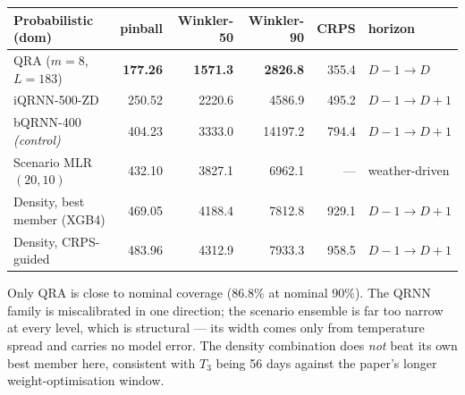 \documentclass[11pt]{article}
\begin{document}
\begin{center}\small
\begin{tabular}{@{}lrrrrl@{}}
\toprule
Probabilistic (dom) & pinball & Winkler-50 & Winkler-90 & CRPS & horizon \\
\midrule
QRA ($m{=}8$, $L{=}183$)        & \textbf{177.26} & \textbf{1571.3} & \textbf{2826.8} & 355.4 & $D{-}1 \to D$ \\
iQRNN-500-ZD                    & 250.52 & 2220.6 & 4586.9 & 495.2 & $D{-}1 \to D{+}1$ \\
bQRNN-400 \emph{(control)}      & 404.23 & 3333.0 & 14197.2 & 794.4 & $D{-}1 \to D{+}1$ \\
Scenario MLR $(20,10)$          & 432.10 & 3827.1 & 6962.1 & --- & weather-driven \\
Density, best member (XGB4)     & 469.05 & 4188.4 & 7812.8 & 929.1 & $D{-}1 \to D{+}1$ \\
Density, CRPS-guided            & 483.96 & 4312.9 & 7933.3 & 958.5 & $D{-}1 \to D{+}1$ \\
\bottomrule
\end{tabular}
\end{center}

\noindent
Only QRA is close to nominal coverage ($86.8\%$ at nominal $90\%$). The QRNN family
is miscalibrated in one direction; the scenario ensemble is far too narrow at every
level, which is structural --- its width comes only from temperature spread and
carries no model error. The density combination does \emph{not} beat its own best
member here, consistent with $T_3$ being 56 days against the paper's longer
weight-optimisation window.
\end{document}
